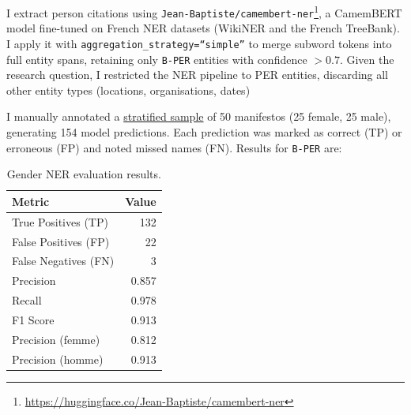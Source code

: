 \documentclass{article}
\begin{document}
I extract person citations using \texttt{Jean-Baptiste/camembert-ner}\footnote{\url{https://huggingface.co/Jean-Baptiste/camembert-ner}}, a CamemBERT model fine-tuned on French NER datasets (WikiNER and the French TreeBank). I apply it with \texttt{aggregation\_strategy=``simple''} to merge subword tokens into full entity spans, retaining only \texttt{B-PER} entities with confidence $> 0.7$. Given the research question, I restricted the NER pipeline to PER entities, discarding all other entity types (locations, organisations, dates)

I manually annotated a \href{https://github.com/AnahiRM/NER_gender/blob/main/data/annotation_sample_filled_out.csv}{stratified sample} of 50 manifestos (25 female, 25 male), generating 154 model predictions. Each prediction was marked as correct (TP) or erroneous (FP) and noted missed names (FN). Results for \texttt{B-PER} are:


\begin{table}[h]                                                         
    \centering                                                           \begin{tabular}{lr}                                                    \hline                                                               \textbf{Metric} & \textbf{Value} \\                                  \hline                                                               True Positives (TP)  & 132   \\                                      False Positives (FP) & 22    \\                                      False Negatives (FN) & 3     \\                                      \hline                                                               Precision            & 0.857 \\                                      Recall               & 0.978 \\                                      F1 Score             & 0.913 \\                                      \hline                                                               Precision (femme)    & 0.812 \\
      Precision (homme)    & 0.913 \\                                    \hline                                         
    \end{tabular}  
    \caption{Gender NER evaluation results.}                             \label{tab:ner-eval}
\end{table}
\end{document}
